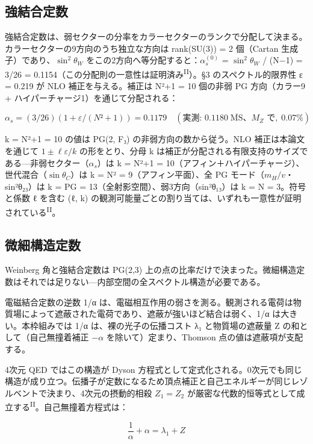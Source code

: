 \documentclass[fontsize=11pt,paper=a4,lualatex]{jlreq}
\newcommand{\PII}{\textsuperscript{\textup{II}}}
\begin{document}
\subsection{強結合定数}\label{ux5f37ux7d50ux5408ux5b9aux6570}

強結合定数は、弱セクターの分率をカラーセクターのランクで分配して決まる。カラーセクターの9方向のうち独立な方向は
rank(SU(3)) = 2 個（Cartan 生成子）であり、$\sin^2\!\theta_W$
をこの2方向へ等分配すると：$\alpha_s^{(0)}$ = $\sin^2\!\theta_W$ / (N−1) = 3/26 = 0.1154（この分配則の一意性は証明済み\PII{}）。§3
のスペクトル的限界性 ε = 0.219 が NLO 補正を与える。補正は N²+1 = 10 個の非弱
PG 方向（カラー9 + ハイパーチャージ1）を通じて分配される：

\[α_s = (3/26)(1 + ε/(N²+1)) = 0.1179 \quad (\text{実測: } 0.1180\;\overline{\mathrm{MS}}\text{、}M_Z\text{ で},\; 0.07\%)\]

k = N²+1 = 10 の値は PG(2, F₃) の非弱方向の数から従う。NLO 補正は本論文を通じて $1 \pm \ell\varepsilon/k$ の形をとり、分母 k は補正が分配される有限支持のサイズである---非弱セクター（$\alpha_s$）は k = N²+1 = 10（アフィン＋ハイパーチャージ）、世代混合（$\sin\theta_C$）は k = N² = 9（アフィン平面）、全 PG モード（$m_H/v$・sin²θ₂₃）は k =
\textbar PG\textbar{} = 13（全射影空間）、弱3方向（sin²θ₁₃）は k = N = 3。符号と係数 ℓ を含む (ℓ, k) の観測可能量ごとの割り当ては、いずれも一意性が証明されている\PII{}。

\subsection{微細構造定数}\label{ux5faeux7d30ux69cbux9020ux5b9aux6570}

Weinberg 角と強結合定数は PG(2,3)
上の点の比率だけで決まった。微細構造定数はそれでは足りない---内部空間の全スペクトル構造が必要である。

電磁結合定数の逆数 1/α は、電磁相互作用の弱さを測る。観測される電荷は物質場によって遮蔽された電荷であり、遮蔽が強いほど結合は弱く、1/α は大きい。本枠組みでは 1/α は、裸の光子の伝播コスト λ₁ と物質場の遮蔽量 Z の和として（自己無撞着補正 $-\alpha$ を除いて）定まり、Thomson 点の値は遮蔽項が支配する。

4次元 QED
ではこの構造が Dyson
方程式として定式化される。0次元でも同じ構造が成り立つ。伝播子が定数になるため頂点補正と自己エネルギーが同じレゾルベントで決まり、4次元の摂動的相殺 $Z_1 = Z_2$ が厳密な代数的恒等式として成立する\PII{}。自己無撞着方程式は：

\[\frac{1}{\alpha} + \alpha = \lambda_1 + Z\]
\end{document}

